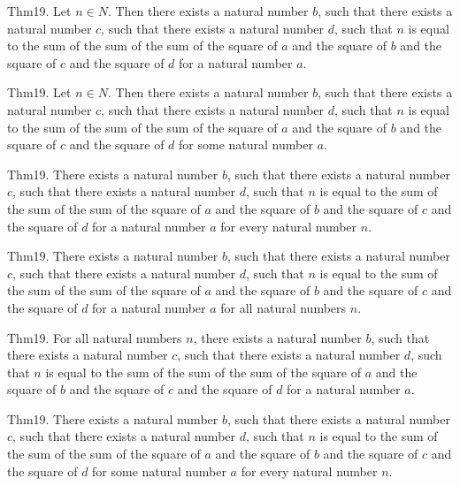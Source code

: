 \documentclass{article}
\begin{document}
Thm19. Let $n \in N$. Then there exists a natural number $b$, such that there exists a natural number $c$, such that there exists a natural number $d$, such that $n$ is equal to the sum of the sum of the sum of the square of $a$ and the square of $b$ and the square of $c$ and the square of $d$ for a natural number $a$.

Thm19. Let $n \in N$. Then there exists a natural number $b$, such that there exists a natural number $c$, such that there exists a natural number $d$, such that $n$ is equal to the sum of the sum of the sum of the square of $a$ and the square of $b$ and the square of $c$ and the square of $d$ for some natural number $a$.

Thm19. There exists a natural number $b$, such that there exists a natural number $c$, such that there exists a natural number $d$, such that $n$ is equal to the sum of the sum of the sum of the square of $a$ and the square of $b$ and the square of $c$ and the square of $d$ for a natural number $a$ for every natural number $n$.

Thm19. There exists a natural number $b$, such that there exists a natural number $c$, such that there exists a natural number $d$, such that $n$ is equal to the sum of the sum of the sum of the square of $a$ and the square of $b$ and the square of $c$ and the square of $d$ for a natural number $a$ for all natural numbers $n$.

Thm19. For all natural numbers $n$, there exists a natural number $b$, such that there exists a natural number $c$, such that there exists a natural number $d$, such that $n$ is equal to the sum of the sum of the sum of the square of $a$ and the square of $b$ and the square of $c$ and the square of $d$ for a natural number $a$.

Thm19. There exists a natural number $b$, such that there exists a natural number $c$, such that there exists a natural number $d$, such that $n$ is equal to the sum of the sum of the sum of the square of $a$ and the square of $b$ and the square of $c$ and the square of $d$ for some natural number $a$ for every natural number $n$.
\end{document}
